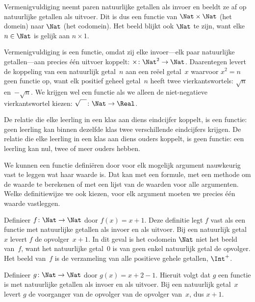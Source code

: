 \documentclass[../../../include/open-logic-section]{subfiles}
\begin{document}
\begin{ex}
Vermenigvuldiging neemt paren natuurlijke getallen als invoer en beeldt ze
af op natuurlijke getallen als uitvoer. Dit is dus een functie van
$\Nat \times \Nat$ (het domein) naar $\Nat$ (het codomein). Het beeld blijkt
ook $\Nat$ te zijn, want elke $n \in \Nat$ is gelijk aan $n \times 1$.
\end{ex}

\begin{ex}
Vermenigvuldiging is een functie, omdat zij elke invoer---elk paar natuurlijke
getallen---aan precies één uitvoer koppelt: $\times \colon \Nat^2 \to
\Nat$. Daarentegen levert de koppeling van een natuurlijk getal~$n$ aan een
reëel getal~$x$ waarvoor $x^2 = n$ geen functie op, want elk positief geheel
getal~$n$ heeft twee vierkantswortels: $\sqrt{n}$ en~$-\sqrt{n}$. We krijgen
wel een functie als we alleen de niet-negatieve vierkantswortel kiezen:
$\sqrt{\phantom{X}} \colon \Nat \to \Real$.
\end{ex}

\begin{ex}
De relatie die elke leerling in een klas aan diens eindcijfer koppelt, is een
functie: geen leerling kan binnen dezelfde klas twee verschillende eindcijfers
krijgen. De relatie die elke leerling in een klas aan diens ouders koppelt, is
geen functie: een leerling kan nul, twee of meer ouders hebben.
\end{ex}

\begin{explain}
We kunnen een functie definiëren door voor elk mogelijk argument nauwkeurig
vast te leggen wat haar waarde is. Dat kan met een formule, met een methode om
de waarde te berekenen of met een lijst van de waarden voor alle argumenten.
Welke definitiewijze we ook kiezen, voor elk argument moeten we precies één
waarde vastleggen.
\end{explain}


\begin{ex}
Definieer $f \colon \Nat \to \Nat$ door $f(x) = x+1$. Deze definitie legt
$f$ vast als een functie met natuurlijke getallen als invoer en als uitvoer.
Bij een natuurlijk getal~$x$ levert $f$ de opvolger~$x+1$.
In dit geval is het codomein $\Nat$ niet het beeld van~$f$, want het
natuurlijke getal~$0$ is van geen enkel natuurlijk getal de opvolger. Het
beeld van~$f$ is de verzameling van alle positieve gehele getallen,
$\Int^{+}$.
\end{ex}

\begin{ex}
Definieer $g \colon \Nat \to \Nat$ door $g(x) = x+2-1$. Hieruit volgt dat
$g$ een functie is met natuurlijke getallen als invoer en als uitvoer. Bij een
natuurlijk getal~$x$ levert $g$ de voorganger van de opvolger van de opvolger
van~$x$, dus $x+1$.
\end{ex}
\end{document}
